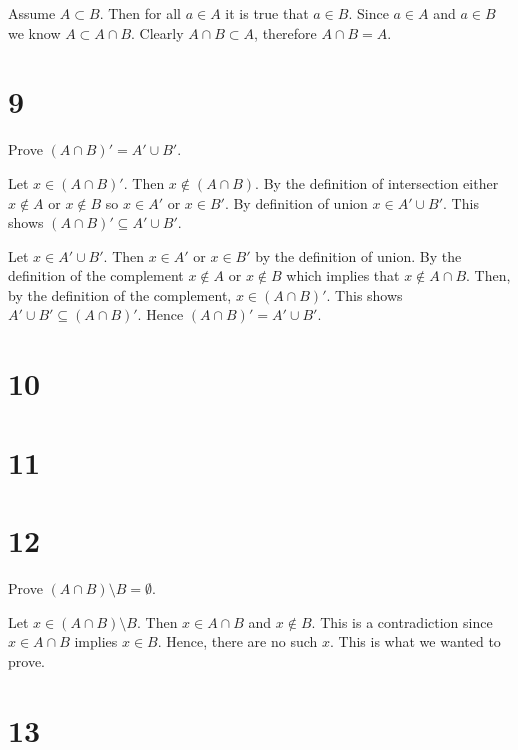 \documentclass[a4paper]{article}
\begin{document}
Assume $A \subset B$. Then for all $a \in A$ it is true that $a \in B$. Since $a \in A$ and $a \in B$ we know $A \subset A \cap B$. Clearly $A \cap B \subset A$, therefore $A \cap B = A$.


\section*{9}

Prove $(A \cap B)' = A' \cup B'$.

\vspace{\baselineskip}

Let $x \in (A \cap B)'$. Then $x \not \in (A \cap B)$. By the definition of intersection either $x \not \in A$ or $x \not \in B$ so $x \in A'$ or $x \in B'$. By definition of union $x \in A' \cup B'$. This shows $(A \cap B)' \subseteq A' \cup B'$.

\vspace{\baselineskip}

Let $x \in A' \cup B'$. Then $x \in A'$ or $x \in B'$ by the definition of union. By the definition of the complement $x \not \in A$ or $x \not \in B$ which implies that $x \not \in A \cap B$. Then, by the definition of the complement, $x \in (A \cap B)'$. This shows $A' \cup B' \subseteq (A \cap B)'$.  Hence $(A \cap B)' = A' \cup B'$.



\section*{10}


\section*{11}


\section*{12}

Prove $(A \cap B) \setminus B = \emptyset$.

\vspace{\baselineskip}

Let $ x \in (A \cap B) \setminus B$. Then $x \in A \cap B$ and $x \not\in B$. This is a contradiction since $x \in A \cap B$ implies $x \in B$. Hence, there are no such $x$. This is what we wanted to prove.


\section*{13}
\end{document}
